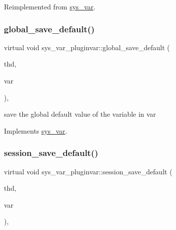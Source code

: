 Reimplemented from \mbox{\hyperlink{classsys__var_a88d98571d9c10c74b02ab4edd09a493c}{sys\+\_\+var}}.

\mbox{\label{classsys__var__pluginvar_abd689ffd6c8f1915085065a751573284}} 
\subsubsection{\texorpdfstring{global\+\_\+save\+\_\+default()}{global\_save\_default()}}
{\footnotesize\ttfamily virtual void sys\+\_\+var\+\_\+pluginvar\+::global\+\_\+save\+\_\+default (\begin{DoxyParamCaption}\item[{T\+HD $\ast$}]{thd,  }\item[{\mbox{\hyperlink{classset__var}{set\+\_\+var}} $\ast$}]{var }\end{DoxyParamCaption})\hspace{0.3cm}{\ttfamily [inline]}, {\ttfamily [virtual]}}

save the global default value of the variable in var 

Implements \mbox{\hyperlink{classsys__var}{sys\+\_\+var}}.

\mbox{\label{classsys__var__pluginvar_a7e3931116eeeeeaa4c43d17c1554c92d}} 
\subsubsection{\texorpdfstring{session\+\_\+save\+\_\+default()}{session\_save\_default()}}
{\footnotesize\ttfamily virtual void sys\+\_\+var\+\_\+pluginvar\+::session\+\_\+save\+\_\+default (\begin{DoxyParamCaption}\item[{T\+HD $\ast$}]{thd,  }\item[{\mbox{\hyperlink{classset__var}{set\+\_\+var}} $\ast$}]{var }\end{DoxyParamCaption})\hspace{0.3cm}{\ttfamily [inline]}, {\ttfamily [virtual]}}

